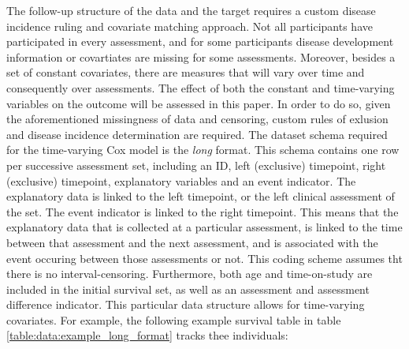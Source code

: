 The follow-up structure of the data and the target requires a custom disease incidence ruling and covariate matching approach. Not all participants have participated in every assessment, and for some participants disease development information or covartiates are missing for some assessments. Moreover, besides a set of constant covariates, there are measures that will vary over time and consequently over assessments. The effect of both the constant and time-varying variables on the outcome will be assessed in this paper. In order to do so, given the aforementioned missingness of data and censoring, custom rules of exlusion and disease incidence determination are required. The dataset schema required for the time-varying Cox model is the \textit{long} format. This schema contains one row per successive assessment set, including an ID, left (exclusive) timepoint, right (exclusive) timepoint, explanatory variables and an event indicator. The explanatory data is linked to the left timepoint, or the left clinical assessment of the set. The event indicator is linked to the right timepoint. This means that the explanatory data that is collected at a particular assessment, is linked to the time between that assessment and the next assessment, and is associated with the event occuring between those assessments or not. This coding scheme assumes tht there is no interval-censoring. Furthermore, both age and time-on-study are included in the initial survival set, as well as an assessment and assessment difference indicator. This particular data structure allows for time-varying covariates. For example, the following example survival table in table \ref{table:data:example_long_format} tracks thee individuals:
\vspace{0.5cm}
